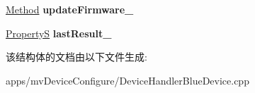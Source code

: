 \begin{DoxyCompactItemize}
\item 
\hypertarget{struct_update_features_adaf5f2eaeb1febd0f17a1b0657a62c69}{\hyperlink{classmv_i_m_p_a_c_t_1_1acquire_1_1_method}{Method} {\bfseries update\+Firmware\+\_\+}}\label{struct_update_features_adaf5f2eaeb1febd0f17a1b0657a62c69}

\item 
\hypertarget{struct_update_features_a12db3832398c3521bd329af7ae384b3d}{\hyperlink{classmv_i_m_p_a_c_t_1_1acquire_1_1_property_s}{Property\+S} {\bfseries last\+Result\+\_\+}}\label{struct_update_features_a12db3832398c3521bd329af7ae384b3d}

\end{DoxyCompactItemize}


该结构体的文档由以下文件生成\+:\begin{DoxyCompactItemize}
\item 
apps/mv\+Device\+Configure/Device\+Handler\+Blue\+Device.\+cpp\end{DoxyCompactItemize}
